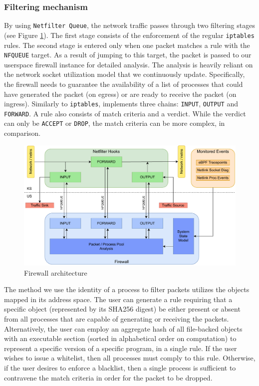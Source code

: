 \subsubsection{Filtering mechanism}

By using \texttt{Netfilter Queue}, the network traffic passes through two filtering stages (see Figure \ref{appfw:daf:fig:fw-architecture}). The first stage consists of the enforcement of the regular \texttt{iptables} rules. The second stage is entered only when one packet matches a rule with the \texttt{NFQUEUE} target. As a result of jumping to this target, the packet is passed to our userspace firewall instance for detailed analysis. The analysis is heavily reliant on the network socket utilization model that we continuously update. Specifically, the firewall needs to guarantee the availability of a list of processes that could have generated the packet (on egress) or are ready to receive the packet (on ingress). Similarly to \texttt{iptables}, \daf{} implements three chains: \texttt{INPUT}, \texttt{OUTPUT} and \texttt{FORWARD}. A \daf{} rule also consists of match criteria and a verdict. While the verdict can only be \texttt{ACCEPT} or \texttt{DROP}, the match criteria can be more complex, in comparison.

\begin{figure}[h]
    \centering
    \includegraphics[width=\textwidth,keepaspectratio]{figures/daf-fw-architecture.pdf}
    \caption{Firewall architecture}
    \label{appfw:daf:fig:fw-architecture}
\end{figure}

The method we use the identity of a process to filter packets utilizes the objects mapped in its address space. The user can generate a rule requiring that a specific object (represented by its SHA256 digest) be either present or absent from all processes that are capable of generating or receiving the packets. Alternatively, the user can employ an aggregate hash of all file-backed objects with an executable section (sorted in alphabetical order on computation) to represent a specific version of a specific program, in a single rule. If the user wishes to issue a whitelist, then all processes must comply to this rule. Otherwise, if the user desires to enforce a blacklist, then a single process is sufficient to contravene the match criteria in order for the packet to be dropped.

